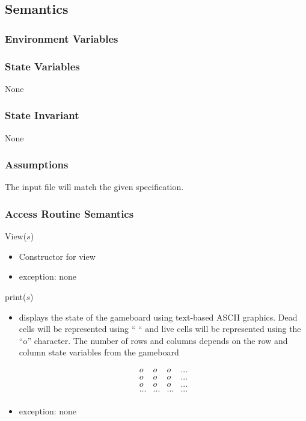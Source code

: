 \documentclass[12pt]{article}
\begin{document}
\subsection* {Semantics}

\subsubsection* {Environment Variables}

\subsubsection* {State Variables}

None

\subsubsection* {State Invariant}

None

\subsubsection* {Assumptions}

The input file will match the given specification.

\subsubsection* {Access Routine Semantics}

\noindent View($s$)
\begin{itemize}
\item Constructor for view

\item exception: none
\end{itemize}

\noindent print($s$)
\begin{itemize}
\item displays the state of the gameboard using text-based ASCII graphics. Dead cells will be represented using `` `` and live cells will be represented using the ``o'' character.
The number of rows and columns depends on the row and column state variables from the gameboard

  \begin{equation}
    \begin{array}{cccc}
      o & o & o & ... \\
      o & o & o & ... \\
      o & o & o & ... \\
      ... & ... & ... & ...\\

    \end{array}
  \end{equation}

\item exception: none
\end{itemize}
\end{document}
